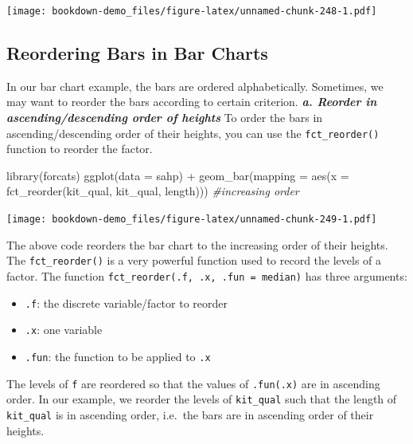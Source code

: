 \documentclass[
]{book}
\newenvironment{Shaded}{\begin{snugshade}}{\end{snugshade}}
\newcommand{\AttributeTok}[1]{\textcolor[rgb]{0.77,0.63,0.00}{#1}}
\newcommand{\CommentTok}[1]{\textcolor[rgb]{0.56,0.35,0.01}{\textit{#1}}}
\newcommand{\FunctionTok}[1]{\textcolor[rgb]{0.00,0.00,0.00}{#1}}
\newcommand{\NormalTok}[1]{#1}
\newcommand{\SpecialCharTok}[1]{\textcolor[rgb]{0.00,0.00,0.00}{#1}}
\providecommand{\tightlist}{%
  \setlength{\itemsep}{0pt}\setlength{\parskip}{0pt}}
\begin{document}
\texttt{[image: bookdown-demo\_files/figure-latex/unnamed-chunk-248-1.pdf]}

\hypertarget{reordering-bars-in-bar-charts}{%
\subsection{Reordering Bars in Bar Charts}\label{reordering-bars-in-bar-charts}}

In our bar chart example, the bars are ordered alphabetically. Sometimes, we may want to reorder the bars according to certain criterion.
\textbf{\emph{a. Reorder in ascending/descending order of heights}}
To order the bars in ascending/descending order of their heights, you can use the \texttt{fct\_reorder()} function to reorder the factor.

\begin{Shaded}
\begin{Highlighting}[]
\FunctionTok{library}\NormalTok{(forcats)}
\FunctionTok{ggplot}\NormalTok{(}\AttributeTok{data =}\NormalTok{ sahp) }\SpecialCharTok{+} \FunctionTok{geom\_bar}\NormalTok{(}\AttributeTok{mapping =} \FunctionTok{aes}\NormalTok{(}\AttributeTok{x =} \FunctionTok{fct\_reorder}\NormalTok{(kit\_qual, kit\_qual, length))) }\CommentTok{\#increasing order}
\end{Highlighting}
\end{Shaded}

\texttt{[image: bookdown-demo\_files/figure-latex/unnamed-chunk-249-1.pdf]}

The above code reorders the bar chart to the increasing order of their heights. The \texttt{fct\_reorder()} is a very powerful function used to record the levels of a factor. The function \texttt{fct\_reorder(.f,\ .x,\ .fun\ =\ median)} has three arguments:

\begin{itemize}
\tightlist
\item
  \texttt{.f}: the discrete variable/factor to reorder
\item
  \texttt{.x}: one variable
\item
  \texttt{.fun}: the function to be applied to \texttt{.x}
\end{itemize}

The levels of \texttt{f} are reordered so that the values of \texttt{.fun(.x)} are in ascending order. In our example, we reorder the levels of \texttt{kit\_qual} such that the length of \texttt{kit\_qual} is in ascending order, i.e.~the bars are in ascending order of their heights.
\end{document}
